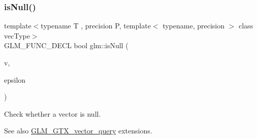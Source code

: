 \subsubsection{\texorpdfstring{is\+Null()}{isNull()}}
{\footnotesize\ttfamily template$<$typename T , precision P, template$<$ typename, precision $>$ class vec\+Type$>$ \\
G\+L\+M\+\_\+\+F\+U\+N\+C\+\_\+\+D\+E\+CL bool glm\+::is\+Null (\begin{DoxyParamCaption}\item[{vec\+Type$<$ T, P $>$ const \&}]{v,  }\item[{T const \&}]{epsilon }\end{DoxyParamCaption})}

Check whether a vector is null. \begin{DoxySeeAlso}{See also}
\hyperlink{group__gtx__vector__query}{G\+L\+M\+\_\+\+G\+T\+X\+\_\+vector\+\_\+query} extensions. 
\end{DoxySeeAlso}
